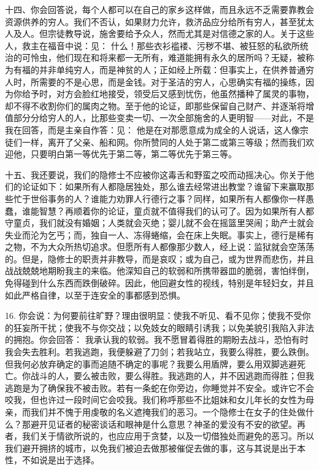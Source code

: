 十四、你会回答说，每个人都可以在自己的家乡这样做，而且永远不乏需要靠教会资源供养的穷人。我们不否认，如果财力允许，救济品应分给所有穷人，甚至犹太人及人。但宗徒教导说，施舍要给予众人，然而尤其是对信德之家的人。关于这些人，救主在福音中说：见： 什么！那些衣衫褴褛、污秽不堪、被狂怒的私欲所统治的可怜虫，他们现在和将来都一无所有，难道能拥有永久的居所吗？无疑，被称为有福的并非单纯穷人，而是神贫的人；正如经上所载：但事实上，在供养普通穷人时，所需要的不是心思，而是金钱。对于圣洁的穷人，心思确实有福的操练，因为你给予时，对方会脸红地接受，领受后又感到忧伤，他虽然播种了属灵的事物，却不得不收割你们的属肉之物。至于他的论证，即那些保留自己财产、并逐渐将增值部分分给穷人的人，比那些变卖一切、一次全部施舍的人更明智——对此，不是我在回答，而是主亲自作答：见： 他是在对那愿意成为成全的人说话，这人像宗徒们一样，离开了父亲、船和网。你所赞同的人处于第二或第三等级；然而我们欢迎他，只要明白第一等优先于第二等，第二等优先于第三等。\par

十五、我还要说，我们的隐修士不应被你这毒舌和野蛮之咬而动摇决心。你关于他们的论证如下：如果所有人都隐居独处，那么谁去经常进出教堂？谁留下来赢取那些忙于世俗事务的人？谁能力劝罪人行德行之事？同样，如果所有人都像你一样愚蠢，谁能智慧？再顺着你的论证，童贞就不值得我们的认可了。因为如果所有人都守童贞，我们就没有婚姻；人类就会灭绝；婴儿就不会在摇篮里哭闹；助产士就会失业而沦为乞丐；而，独自一人、冻得蜷缩，会在床上失眠。事实上，德行是稀有之物，不为大众所热切追求。但愿所有人都像那少数人，经上说：监狱就会空荡荡的。但是，隐修士的职责并非教导，而是哀叹；或为自己，或为世界而悲伤，并且战战兢兢地期盼我主的来临。他深知自己的软弱和所携带器皿的脆弱，害怕绊倒，免得碰到什么东西而跌倒破碎。因此，他回避女性的视线，特别是年轻妇女，并且如此严格自律，以至于连安全的事都感到恐惧。\par

16. 你会说：为何要前往旷野？理由很明显：使我不听见、看不见你；使我不受你的狂妄所干扰；使我不与你交战；以免妓女的眼睛引诱我；以免美貌引我陷入非法的拥抱。你会回答： 我承认我的软弱。我不愿冒着得胜的期盼去战斗，恐怕有时我会失去胜利。若我逃跑，我便躲避了刀剑；若我站立，我要么得胜，要么跌倒。但我何必放弃确定的事而追随不确定的事呢？我要么用盾牌，要么用双脚逃避死亡。你战斗的人，要么被击败，要么得胜。我逃跑的人，并不因逃跑而得胜；但我逃跑是为了确保我不被击败。若有一条蛇在你旁边，你睡觉并不安全。或许它不会咬我，但也许过一段时间它会咬我。我们称呼那些不比姐妹和女儿年长的女性为母亲，而我们并不愧于用虔敬的名义遮掩我们的恶习。一个隐修士在女子的住处做什么？那避开见证者的秘密谈话和眼神是什么意思？神圣的爱没有不安的欲望。再者，我们关于情欲所说的，也应应用于贪婪，以及一切借独处而避免的恶习。所以我们避开拥挤的城市，以免我们被迫去做那被催促去做的事，这与其说是出于本性，不如说是出于选择。\par

